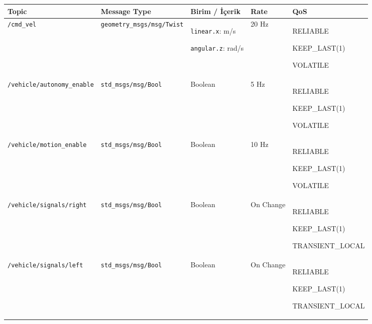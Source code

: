 \documentclass[12pt,a4paper]{article}
\begin{document}
\clearpage

\begin{landscape}

\thispagestyle{plain}

\begin{table}[p]

\centering

\small

\renewcommand{\arraystretch}{1.35}

\begin{tabularx}{\linewidth}{
|L{5.2cm}
|L{5.0cm}
|L{4.0cm}
|L{2.2cm}
|Y|
}

\hline

\textbf{Topic}
&
\textbf{Message Type}
&
\textbf{Birim / İçerik}
&
\textbf{Rate}
&
\textbf{QoS}
\\

\hline

\texttt{/cmd\_vel}
&
\texttt{geometry\_msgs/msg/Twist}
&
\texttt{linear.x}: m/s

\texttt{angular.z}: rad/s
&
20 Hz
&
RELIABLE

KEEP\_LAST(1)

VOLATILE
\\

\hline

\texttt{/vehicle/autonomy\_enable}
&
\texttt{std\_msgs/msg/Bool}
&
Boolean
&
5 Hz
&
RELIABLE

KEEP\_LAST(1)

VOLATILE
\\

\hline

\texttt{/vehicle/motion\_enable}
&
\texttt{std\_msgs/msg/Bool}
&
Boolean
&
10 Hz
&
RELIABLE

KEEP\_LAST(1)

VOLATILE
\\

\hline

\texttt{/vehicle/signals/right}
&
\texttt{std\_msgs/msg/Bool}
&
Boolean
&
On Change
&
RELIABLE

KEEP\_LAST(1)

TRANSIENT\_LOCAL
\\

\hline

\texttt{/vehicle/signals/left}
&
\texttt{std\_msgs/msg/Bool}
&
Boolean
&
On Change
&
RELIABLE

KEEP\_LAST(1)

TRANSIENT\_LOCAL
\\


\end{tabularx}
\end{table}
\end{landscape}
\end{document}
